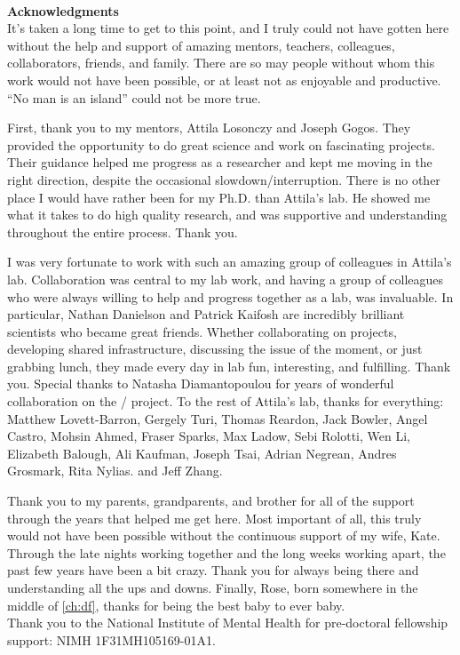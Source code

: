 ~\\[1in] %
\textbf{\Huge Acknowledgments}\\

It's taken a long time to get to this point, and I truly could not have gotten here without the help and support of  amazing mentors, teachers, colleagues, collaborators, friends, and family.
There are so may people without whom this work would not have been possible, or at least not as enjoyable and productive. ``No man is an island'' could not be more true.

First, thank you to my mentors, Attila Losonczy and Joseph Gogos. They provided the opportunity to do great science and work on fascinating projects. Their guidance helped me progress as a researcher and kept me moving in the right direction, despite the occasional slowdown/interruption. There is no other place I would have rather been for my Ph.D. than Attila's lab. He showed me what it takes to do high quality research, and was supportive and understanding throughout the entire process. Thank you.

I was very fortunate to work with such an amazing group of colleagues in Attila's lab. Collaboration was central to my lab work, and having a group of colleagues who were always willing to help and progress together as a lab, was invaluable.
In particular, Nathan Danielson and Patrick Kaifosh are incredibly brilliant scientists who became great friends. Whether collaborating on projects, developing shared infrastructure, discussing the issue of the moment, or just grabbing lunch, they made every day in lab fun, interesting, and fulfilling. Thank you.
Special thanks to Natasha Diamantopoulou for years of wonderful collaboration on the \df/ project.
To the rest of Attila's lab, thanks for everything: Matthew Lovett-Barron, Gergely Turi, Thomas Reardon, Jack Bowler, Angel Castro, Mohsin Ahmed, Fraser Sparks, Max Ladow, Sebi Rolotti, Wen Li, Elizabeth Balough, Ali Kaufman, Joseph Tsai, Adrian Negrean, Andres Grosmark, Rita Nylias. and Jeff Zhang.

Thank you to my parents, grandparents, and brother for all of the support through the years that helped me get here. Most important of all, this truly would not have been possible without the continuous support of my wife, Kate. Through the late nights working together and the long weeks working apart, the past few years have been a bit crazy. Thank you for always being there and understanding all the ups and downs. Finally, Rose, born somewhere in the middle of \autoref{ch:df}, thanks for being the best baby to ever baby.
\\

Thank you to the National Institute of Mental Health for pre-doctoral fellowship support: NIMH 1F31MH105169-01A1.

